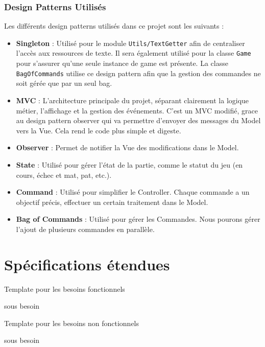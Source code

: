 \documentclass{article}
\begin{document}
\subsubsection{Design Patterns Utilisés}

Les différents design patterns utilisés dans ce projet sont les suivants : 
\begin{itemize}
    \item \textbf{Singleton} : Utilisé pour le module \texttt{Utils/TextGetter} afin de centraliser l'accès aux ressources de texte. Il sera également utilisé pour
la classe \texttt{Game} pour s'assurer qu'une seule instance de game est présente. La classe \texttt{BagOfCommands} utilise ce design pattern afin que la gestion des commandes
ne soit gérée que par un seul bag.
    \item \textbf{MVC} : L'architecture principale du projet, séparant clairement la logique métier, l'affichage et la gestion des événements. C'est un MVC modifié,
 grace au design pattern observer qui va permettre d'envoyer des messages du Model vers la Vue. Cela rend le code plus simple et digeste.
    \item \textbf{Observer} : Permet de notifier la Vue des modifications dans le Model.
    \item \textbf{State} : Utilisé pour gérer l'état de la partie, comme le statut du jeu (en cours, échec et mat, pat, etc.).
    \item \textbf{Command} : Utilisé pour simplifier le Controller. Chaque commande a un objectif précis, effectuer un certain traitement dans le Model.
    \item \textbf{Bag of Commands} : Utilisé pour gérer les Commandes. Nous pourons gérer l'ajout de plusieurs commandes en parallèle.
\end{itemize}


\section{Spécifications étendues}

\begin{needbox}[F?: Titre]
    Template pour les besoins fonctionnels
    \begin{subneedbox}[F?.?: Titre]
        sous besoin 
    \end{subneedbox}
\end{needbox}

\begin{nonfunctionnalneedbox}[F?: Titre]
    Template pour les besoins non fonctionnels
    \begin{subneedbox}[F?.?: Titre]
        sous besoin
    \end{subneedbox}
\end{nonfunctionnalneedbox}
\end{document}
